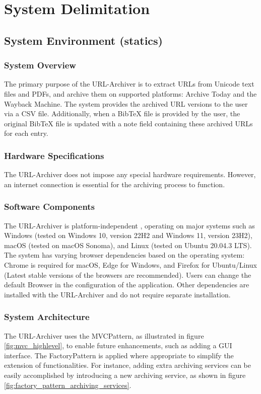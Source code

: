 \section{System Delimitation}

\subsection{System Environment (statics)}
\subsubsection{System Overview}
The primary purpose of the URL-Archiver is to extract URLs from Unicode text files and PDFs, and archive them on supported platforms: Archive Today and the Wayback Machine. The system provides the archived URL versions to the user via a CSV file. Additionally, when a BibTeX file is provided by the user, the original BibTeX file is updated with a note field containing these archived URLs for each entry.

\subsubsection{Hardware Specifications}
The URL-Archiver does not impose any special hardware requirements. However, an internet connection  is essential for the archiving process to function.

\subsubsection{Software Components}
The URL-Archiver is platform-independent , operating on major systems such as Windows (tested on Windows 10, version 22H2  and Windows 11, version 23H2), macOS (tested on macOS Sonoma), and Linux (tested on Ubuntu 20.04.3 LTS). The system has varying browser dependencies based on the operating system: Chrome is required for macOS, Edge for Windows, and Firefox for Ubuntu/Linux (Latest stable versions of the browsers are recommended). Users can change the default Browser in the configuration of the application. Other dependencies are installed with the URL-Archiver and do not require separate installation.

\subsubsection{System Architecture}
The URL-Archiver uses the \gls{MVCPattern}, as illustrated in figure \ref{fig:mvc_highlevel}, to enable future enhancements, such as adding a \gls{GUI} interface. The \gls{FactoryPattern} is applied where appropriate to simplify the extension of functionalities. For instance, adding extra archiving services  can be easily accomplished by introducing a new archiving service, as shown in figure \ref{fig:factory_pattern_archiving_services}.

